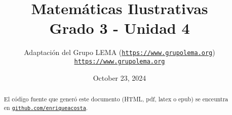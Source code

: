 \documentclass[twoside,14pt,]{extarticle}
\title{Matemáticas Ilustrativas\\
{\large Grado 3 - Unidad 4}}
\author{Adaptación del Grupo LEMA (\href{https://www.grupolema.org}{\nolinkurl{https://www.grupolema.org}})\\
\href{https://www.grupolema.org}{\nolinkurl{https://www.grupolema.org}}
}
\date{October 23, 2024}
\begin{document}
\raggedbottom
\label{gra3-uni4}\hypertarget{gra3-uni4}{}
\maketitle
\thispagestyle{empty}
\renewcommand*{\abstractname}{Resumen}
\begin{abstract}
\end{abstract}
\renewcommand*{\abstractname}{Resumen}
\begin{abstract}
El código fuente que generó este documento (HTML, pdf, latex o epub) se enceuntra en \href{https://github.com/enriqueacosta/IllustrativeMath-GrupoLEMA}{\nolinkurl{github.com/enriqueacosta}}.%
\end{abstract}
\renewcommand*{\abstractname}{Resumen}
\end{document}
